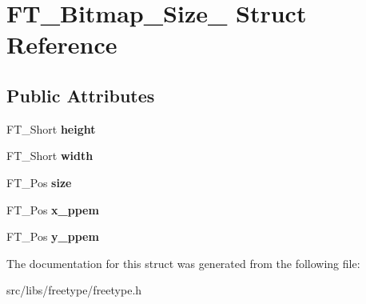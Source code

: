 \hypertarget{struct_f_t___bitmap___size__}{
\section{FT\_\-Bitmap\_\-Size\_\- Struct Reference}
\label{struct_f_t___bitmap___size__}
}
\subsection*{Public Attributes}
\begin{DoxyCompactItemize}
\item 
\hypertarget{struct_f_t___bitmap___size___adf2f24039b458ff4674712886f242262}{
FT\_\-Short {\bfseries height}}
\label{struct_f_t___bitmap___size___adf2f24039b458ff4674712886f242262}

\item 
\hypertarget{struct_f_t___bitmap___size___ab9da94223f75a89a649d1e6d018b17f1}{
FT\_\-Short {\bfseries width}}
\label{struct_f_t___bitmap___size___ab9da94223f75a89a649d1e6d018b17f1}

\item 
\hypertarget{struct_f_t___bitmap___size___a1db23a6220fb6bcb712430821a6e5352}{
FT\_\-Pos {\bfseries size}}
\label{struct_f_t___bitmap___size___a1db23a6220fb6bcb712430821a6e5352}

\item 
\hypertarget{struct_f_t___bitmap___size___a6f877a792d2dc93328037c928979215f}{
FT\_\-Pos {\bfseries x\_\-ppem}}
\label{struct_f_t___bitmap___size___a6f877a792d2dc93328037c928979215f}

\item 
\hypertarget{struct_f_t___bitmap___size___a60d4d003d09fd57505f69f39e31e19c1}{
FT\_\-Pos {\bfseries y\_\-ppem}}
\label{struct_f_t___bitmap___size___a60d4d003d09fd57505f69f39e31e19c1}

\end{DoxyCompactItemize}


The documentation for this struct was generated from the following file:\begin{DoxyCompactItemize}
\item 
src/libs/freetype/freetype.h\end{DoxyCompactItemize}
